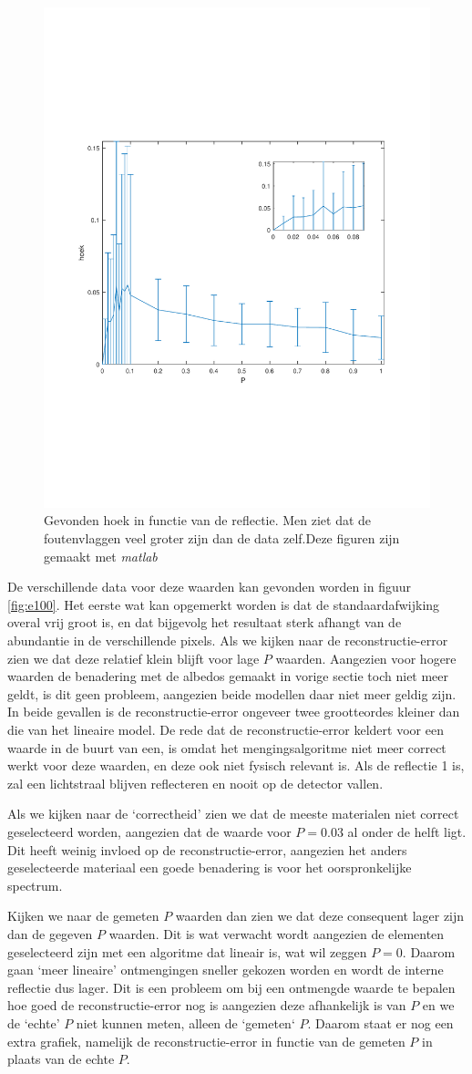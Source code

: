 \documentclass[12pt]{report}
\begin{document}
\begin{figure}
\includegraphics[width=0.49\linewidth,trim=0 200 0 175 cm]{export_PMC_10_100_angle.pdf}
\caption{Gevonden hoek in functie van de reflectie. Men ziet dat de foutenvlaggen veel groter zijn dan de data zelf.Deze figuren zijn gemaakt met \textit{matlab}\cite{MATLAB} \label{fig:hoek}}
\end{figure}

De verschillende data voor deze waarden kan gevonden worden in figuur \ref{fig:e100}. Het eerste wat kan opgemerkt worden is dat de standaardafwijking overal vrij groot is, en dat bijgevolg het resultaat sterk afhangt van de abundantie in de verschillende pixels. Als we kijken naar de reconstructie-error zien we dat deze relatief klein blijft voor lage $P$ waarden. Aangezien voor hogere waarden de benadering met de albedos gemaakt in vorige sectie toch niet meer geldt,  is dit geen probleem, aangezien beide modellen daar niet meer geldig zijn. In beide gevallen is de reconstructie-error ongeveer twee grootteordes kleiner dan die van het lineaire model. De rede dat de reconstructie-error keldert voor een waarde in de buurt van een, is omdat het mengingsalgoritme niet meer correct werkt voor deze waarden, en deze ook niet fysisch relevant is. Als de reflectie 1 is, zal een lichtstraal blijven reflecteren en nooit op de detector vallen.

Als we kijken naar de `correctheid' zien we dat de meeste materialen niet correct geselecteerd worden, aangezien dat de waarde voor $P=0.03$ al onder de helft ligt. Dit heeft weinig invloed op de reconstructie-error, aangezien het anders geselecteerde materiaal een goede benadering is voor het oorspronkelijke spectrum.

Kijken we naar de gemeten $P$ waarden dan zien we dat deze consequent lager zijn dan de gegeven $P$ waarden. Dit is wat verwacht wordt aangezien de elementen geselecteerd zijn met een algoritme dat lineair is, wat wil zeggen $P=0$. Daarom gaan `meer lineaire' ontmengingen sneller gekozen worden en wordt de interne reflectie dus lager. Dit is een probleem om bij een ontmengde waarde te bepalen hoe goed de reconstructie-error nog is aangezien deze afhankelijk is van $P$ en we de `echte' $P$ niet kunnen meten, alleen de `gemeten` $P$. Daarom staat er nog een extra grafiek, namelijk de reconstructie-error in functie van de gemeten $P$ in plaats van de echte $P$.
\end{document}
